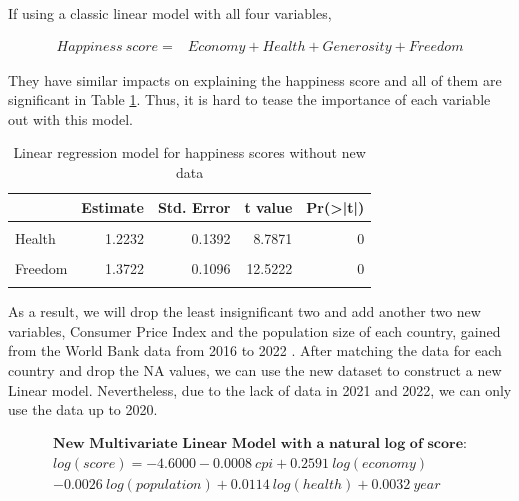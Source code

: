 \documentclass[11pt,a4paper,]{article}
\begin{document}
If using a classic linear model with all four variables,

\[
\begin{aligned}
Happiness\ score=& Economy+Health+Generosity+Freedom
\end{aligned}
\]

They have similar impacts on explaining the happiness score and all of them are significant in Table \ref{tab:without}. Thus, it is hard to tease the importance of each variable out with this model.

\begin{table}

\caption{\label{tab:without}Linear regression model for happiness scores without new data}
\centering
\begin{tabular}[t]{l|r|r|r|r}
\hline
  & Estimate & Std. Error & t value & Pr(>|t|)\\
\hline
\cellcolor{gray!6}{(Intercept)} & \cellcolor{gray!6}{2.4374} & \cellcolor{gray!6}{0.0753} & \cellcolor{gray!6}{32.3704} & \cellcolor{gray!6}{0}\\
\hline
Health & 1.2232 & 0.1392 & 8.7871 & 0\\
\hline
\cellcolor{gray!6}{Economy} & \cellcolor{gray!6}{1.4543} & \cellcolor{gray!6}{0.0842} & \cellcolor{gray!6}{17.2820} & \cellcolor{gray!6}{0}\\
\hline
Freedom & 1.3722 & 0.1096 & 12.5222 & 0\\
\hline
\cellcolor{gray!6}{Generosity} & \cellcolor{gray!6}{1.1702} & \cellcolor{gray!6}{0.1397} & \cellcolor{gray!6}{8.3785} & \cellcolor{gray!6}{0}\\
\hline
\end{tabular}
\end{table}

As a result, we will drop the least insignificant two and add another two new variables, Consumer Price Index and the population size of each country, gained from the World Bank data from 2016 to 2022 \autocite{world2022}. After matching the data for each country and drop the NA values, we can use the new dataset to construct a new Linear model. Nevertheless, due to the lack of data in 2021 and 2022, we can only use the data up to 2020.

\[
\begin{aligned}
\textbf{New Multivariate Linear Model with a natural log of score}:\\
log(score)= -4.6000-0.0008\ cpi+0.2591\ log(economy)\\-0.0026\ log(population)+0.0114\ log(health)+0.0032\ year
\end{aligned}
\]
\end{document}
